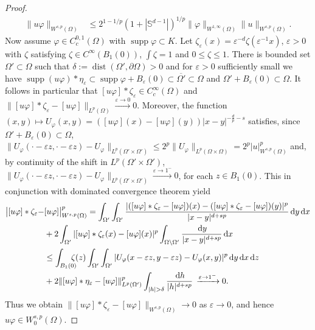 \documentclass[12pt, reqno]{amsart}%
\theoremstyle{plain}  %
\theoremstyle{definition}  %
\theoremstyle{remark}
\numberwithin{equation}{section}
\DeclareMathOperator{\dist}{dist}
\DeclareMathOperator{\supp}{supp}
\renewcommand{\d}{\,\mathrm{d}}
\newcommand{\eps}{\varepsilon}
\begin{document}
\begin{proof}
\begin{align*}
\|u\varphi \|_{W^{s,p}(\Omega)}
&\leq  2^{1-1/p}(1+|\mathbb{S}^{d-1}|)^{1/p} \|\varphi\|_{W^{1,\infty}(\Omega)}  \|u\|_{W^{s,p}(\Omega)}.
\end{align*}
 Now assume $\varphi\in C^{0,1}_c(\Omega)$ with $\supp \varphi\subset K$. Let  $\zeta_\eps(x)=\eps^{-d} \zeta(\eps^{-1}x)$, $\eps>0$ with $\zeta$ satisfying $\zeta\in C^\infty(B_1(0))$, $\int\zeta =1$ and $0\leq \zeta\leq 1$. There is  bounded set $\Omega'\subset \Omega$  such that $\delta:= \dist(\Omega', \partial \Omega)>0$ and for  $\eps>0$ sufficiently small we have $\supp (u\varphi)*\eta_\eps \subset \supp\varphi+ B_\eps(0)\subset \overline{\Omega'}\subset \Omega$ and $\Omega'+ B_\eps(0)\subset\Omega$. It follows in particular that $[u\varphi]*\zeta_\eps\in C_c^\infty(\Omega)$ and $\| [u\varphi]*\zeta_\eps-[u\varphi]\|_{ L^p(\Omega)}\xrightarrow{\eps\to 0}0$.
 Moreover, the function
$(x,y)\mapsto U_\varphi (x, y)=([u\varphi](x)-[u\varphi](y))|x-y|^{-\frac{d	}{p}-s}$ satisfies, since $\Omega'+ B_\eps(0)\subset \Omega$, $\|U_\varphi (\cdot-\eps z, \cdot-\eps z)-U_\varphi \|_{L^p(\Omega'\times\Omega')}\leq 2^p \|U_\varphi \|_{L^p(\Omega\times\Omega)}=2^p |u|^p_{W^{s,p}(\Omega)}$ and, by continuity of the shift in $L^p(\Omega'\times \Omega')$, $\|U_\varphi (\cdot-\eps z, \cdot-\eps z)-U_\varphi \|_{L^p(\Omega'\times\Omega')}\xrightarrow{\eps\to1^-}0$, for each $z\in B_1(0)$. This in conjunction with dominated convergence theorem yield
\begin{align*}
\big|[u\varphi]*\zeta_\eps- &[u\varphi]\big|^p_{W^{s,p}(\Omega)}= \int_{\Omega'}\int_{\Omega'}\frac{|([u\varphi]*\zeta_\eps- [u\varphi])(x)- ([u\varphi]*\zeta_\eps- [u\varphi])(y)|^p}{|x-y|^{d+sp}}\d y\d x\\
&+2 \int_{\Omega'}|[u\varphi]*\zeta_\eps(x)- [u\varphi](x)|^p\int_{\Omega\setminus
\Omega'}\frac{\d y}{|x-y|^{d+sp}}\d x\\
&\leq \int_{B_1(0)}\hspace{-2ex}\zeta(z)\int_{\Omega'}\int_{\Omega'}|U_\varphi (x-\eps z, y-\eps z)-U_\varphi (x, y)|^p\d y\d x\d z \\
&
+2 \|[u\varphi]*\eta_\eps -[u\varphi]\|^p_{L^p(\Omega')}\int_{|h|>\delta}\frac{\d h}{|h|^{d+sp}}\,\xrightarrow{\eps\to1^-}0.
\end{align*}
Thus we obtain  $\| [u\varphi]*\zeta_\eps-[u\varphi]\|_{ W^{s,p}(\Omega)} \to 0$ as $\eps \to 0$, and hence $u\varphi \in W^{s,p}_0(\Omega)$.
\end{proof}
\end{document}
